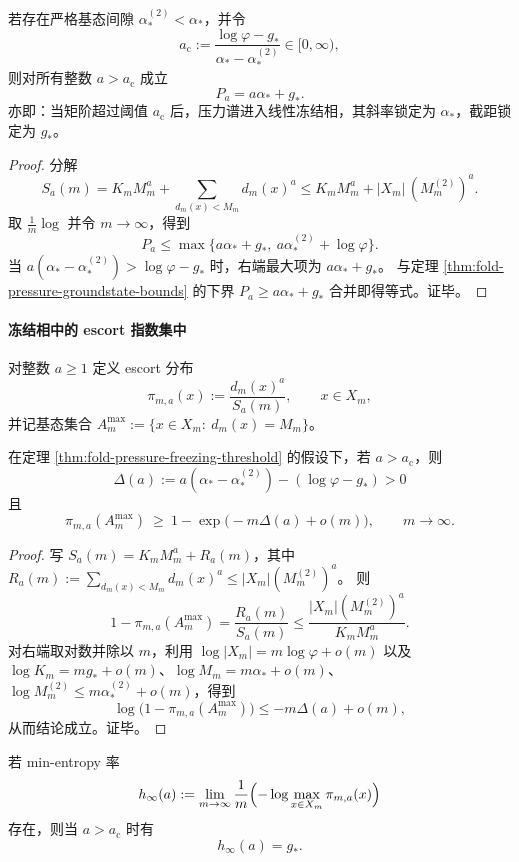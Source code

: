 \begin{theorem}[冻结阈值与高阶线性化]\label{thm:fold-pressure-freezing-threshold}
若存在严格基态间隙 \(\alpha_*^{(2)}<\alpha_*\)，并令
\[
a_{\mathrm c}:=\frac{\log\varphi-g_*}{\alpha_*-\alpha_*^{(2)}}\in[0,\infty),
\]
则对所有整数 \(a>a_{\mathrm c}\) 成立
\[
P_a=a\alpha_*+g_*.
\]
亦即：当矩阶超过阈值 \(a_{\mathrm c}\) 后，压力谱进入线性冻结相，其斜率锁定为 \(\alpha_*\)，截距锁定为 \(g_*\)。
\end{theorem}

\begin{proof}
分解
\[
S_a(m)=K_m M_m^a+\sum_{d_m(x)<M_m} d_m(x)^a
\le K_m M_m^a+|X_m|\,(M_m^{(2)})^a.
\]
取 \(\frac1m\log\) 并令 \(m\to\infty\)，得到
\[
P_a\le \max\{a\alpha_*+g_*,\ a\alpha_*^{(2)}+\log\varphi\}.
\]
当 \(a(\alpha_*-\alpha_*^{(2)})>\log\varphi-g_*\) 时，右端最大项为 \(a\alpha_*+g_*\)。
与定理 \ref{thm:fold-pressure-groundstate-bounds} 的下界 \(P_a\ge a\alpha_*+g_*\) 合并即得等式。证毕。
\end{proof}

\paragraph{冻结相中的 escort 指数集中}
对整数 \(a\ge 1\) 定义 escort 分布
\[
\pi_{m,a}(x):=\frac{d_m(x)^a}{S_a(m)},\qquad x\in X_m,
\]
并记基态集合 \(A_m^{\max}:=\{x\in X_m:\ d_m(x)=M_m\}\)。

\begin{theorem}[基态质量的指数收敛]\label{thm:fold-escort-groundstate-concentration}
在定理 \ref{thm:fold-pressure-freezing-threshold} 的假设下，若 \(a>a_{\mathrm c}\)，则
\[
\Delta(a):=a(\alpha_*-\alpha_*^{(2)})-(\log\varphi-g_*)>0
\]
且
\[
\pi_{m,a}(A_m^{\max})\ \ge\ 1-\exp\!\bigl(-m\Delta(a)+o(m)\bigr),
\qquad m\to\infty.
\]
\end{theorem}

\begin{proof}
写 \(S_a(m)=K_mM_m^a+R_a(m)\)，其中
\(
R_a(m):=\sum_{d_m(x)<M_m} d_m(x)^a\le |X_m|(M_m^{(2)})^a
\)。
则
\[
1-\pi_{m,a}(A_m^{\max})
=\frac{R_a(m)}{S_a(m)}
\le \frac{|X_m|(M_m^{(2)})^a}{K_mM_m^a}.
\]
对右端取对数并除以 \(m\)，利用 \(\log|X_m|=m\log\varphi+o(m)\) 以及 \(\log K_m=mg_*+o(m)\)、\(\log M_m=m\alpha_*+o(m)\)、
\(\log M_m^{(2)}\le m\alpha_*^{(2)}+o(m)\)，得到
\[
\log\bigl(1-\pi_{m,a}(A_m^{\max})\bigr)
\le -m\Delta(a)+o(m),
\]
从而结论成立。证毕。
\end{proof}

\begin{corollary}[冻结相的基态简并指数识别]\label{cor:fold-escort-minentropy-rate}
若 min-entropy 率
\[
h_\infty(a):=\lim_{m\to\infty}\frac{1}{m}\Bigl(-\log\max_{x\in X_m}\pi_{m,a}(x)\Bigr)
\]
存在，则当 \(a>a_{\mathrm c}\) 时有
\[
h_\infty(a)=g_*.
\]
\end{corollary}

